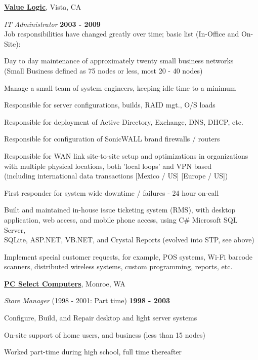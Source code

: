 \documentclass[10pt]{article}
\newcommand{\halfblankline}{\quad\vspace{-0.5\baselineskip}\pagebreak[3]}
\begin{document}
\href{http://www.valuelogic.com/}{\textbf{Value Logic}}, Vista, CA
\begin{outerlist}
  \item[] \textit{IT Administrator}
  \hfill \textbf{2003 - 2009}
  \\Job responsibilities have changed greatly over time; basic list (In-Office and On-Site):
  \begin{innerlist}
    \item Day to day maintenance of approximately twenty small business networks
    \\    (Small Business defined as 75 nodes or less, most 20 - 40 nodes)
    \item Manage a small team of system engineers, keeping idle time to a minimum
    \item Responsible for server configurations, builds, RAID mgt., O/S loads
    \item Responsible for deployment of Active Directory, Exchange, DNS, DHCP, etc.
    \item Responsible for configuration of SonicWALL brand firewalls / routers
    \item Responsible for WAN link site-to-site setup and optimizations in organizations
    \\    with multiple physical locations, both 'local loops' and VPN based
    \\    (including international data transactions [Mexico / US] [Europe / US])
    \item First responder for system wide downtime / failures - 24 hour on-call
    \item Built and maintained in-house issue ticketing system (RMS), with desktop
    \\    application, web access, and mobile phone access, using C\# Microsoft SQL Server,
    \\    SQLite, ASP.NET, VB.NET, and Crystal Reports (evolved into STP, see above)
    \item Implement special customer requests, for example, POS systems, Wi-Fi barcode
    \\    scanners, distributed wireless systems, custom programming, reports, etc.
  \end{innerlist}
\end{outerlist}

\halfblankline

\href{https://web.archive.org/web/*/pcselect.us}{\textbf{PC Select Computers}}, Monroe, WA
\begin{outerlist}
  \item[] \textit{Store Manager}
  \hfill (1998 - 2001: Part time)
  \hfill \textbf{1998 - 2003}
  \begin{innerlist}
    \item Configure, Build, and Repair desktop and light server systems
    \item On-site support of home users, and business (less than 15 nodes)
    \item Worked part-time during high school, full time thereafter
  \end{innerlist}
\end{outerlist}
\end{document}
